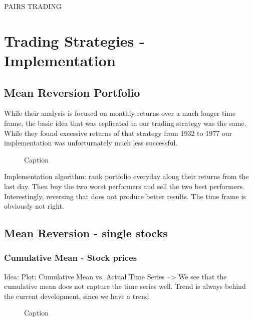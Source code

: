 PAIRS TRADING



\section{Trading Strategies - Implementation}
\subsection{Mean Reversion Portfolio}
While their analysis is focused on monthly returns over a much longer time frame, the basic idea that was replicated in our trading strategy was the same. While they found excessive returns of that strategy from 1932 to 1977 our implementation was unforturnately much less successful.

\begin{figure}
    \centering
    \begin{adjustbox}{width=.7\textwidth,center}
        
    \end{adjustbox}  
    \caption{Caption}
    \label{fig:mean reversion}
\end{figure}{}

Implementation algorithm: rank portfolio everyday along their returns from the last day. Then buy the two worst performers and sell the two best performers. Interestingly, reversing that does not produce better results. The time frame is obviously not right. 

\subsection{Mean Reversion - single stocks}

\subsubsection{Cumulative Mean - Stock prices}
Idea: 
Plot: Cumulative Mean vs. Actual Time Series
--> We see that the cumulative mean does not capture the time series well. Trend is always behind the current development, since we have a trend

\begin{figure}
    \centering
    \begin{minipage}[b]{0.49\textwidth}
        \centering
            \begin{adjustbox}{width=\textwidth,center}
                
            \end{adjustbox}
    \end{minipage}
    \hfill
    \begin{minipage}[b]{0.49\textwidth}
        \centering
        \begin{adjustbox}{width=\textwidth,center}
            
        \end{adjustbox}
    \end{minipage}
    \caption{Caption}
    \label{fig:mean_reversion_cum_mean}
\end{figure}{}

